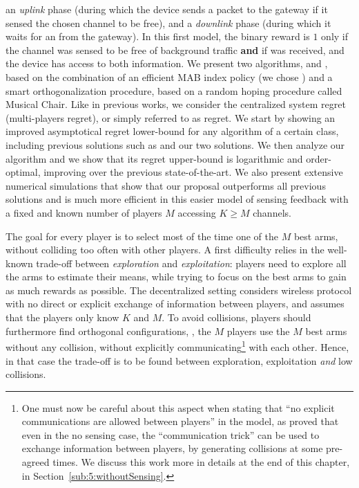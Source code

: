 an \emph{uplink} phase (during which the device sends a packet to the gateway if it sensed the chosen channel to be free),
and a \emph{downlink} phase (during which it waits for an \Ack{} from the gateway).
In this first model, the binary reward is $1$ only if the channel was sensed to be free of background traffic \textbf{and} if \Ack{} was received, and the device has access to both information.
We present two algorithms, \RandTopM{} and \MCTopM, based on the combination of an efficient MAB index policy (we chose \klUCB) and a smart orthogonalization procedure, based on a random hoping procedure called Musical Chair.
Like in previous works, we consider the centralized system regret (multi-players regret), or simply referred to as regret.
We start by showing an improved asymptotical regret lower-bound for any algorithm of a certain class, including previous solutions such as \rhoRand{} and our two solutions.
We then analyze our \MCTopM{} algorithm and we show that its regret upper-bound is logarithmic and order-optimal, improving over the previous state-of-the-art.
We also present extensive numerical simulations that show that our proposal outperforms all previous solutions and is much more efficient in this easier model of sensing feedback with a fixed and known number of players $M$ accessing $K \geq M$ channels.



The goal for every player is to select most of the time one of the $M$ best arms, without colliding too often with other players.
A first difficulty relies in the well-known trade-off between \emph{exploration} and \emph{exploitation}: players need to explore all the arms to estimate their means, while trying to focus on the best arms to gain as much rewards as possible.
The decentralized setting considers wireless protocol with no direct or explicit exchange of information between players, and assumes that the players only know $K$ and $M$. To avoid collisions, players should furthermore find orthogonal configurations, \ie, the $M$ players use the $M$ best arms without any collision, without explicitly communicating\footnote{One must now be careful about this aspect when stating that ``no explicit communications are allowed between players'' in the model, as \cite{BoursierPerchet18} proved that even in the no sensing case, the ``communication trick'' can be used to exchange information between players, by generating collisions at some pre-agreed times. We discuss this work more in details at the end of this chapter, in Section~\ref{sub:5:withoutSensing}.} with each other.
Hence, in that case the trade-off is to be found between exploration, exploitation \emph{and} low collisions.

